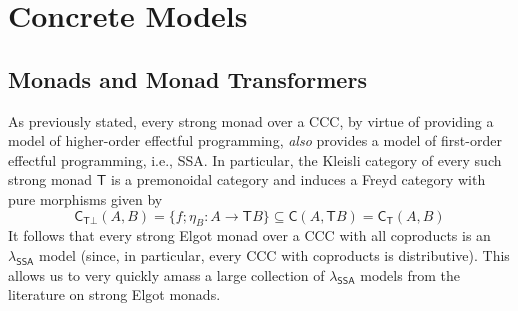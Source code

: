 \documentclass[acmsmall,screen,review]{acmart}
\newcommand{\ms}[1]{\ensuremath{\mathsf{#1}}}
\newcommand{\isotopessa}{\(\lambda_{\ms{SSA}}\)}
\begin{document}
\section{Concrete Models}

\label{sec:concrete}

\subsection{Monads and Monad Transformers}

As previously stated, every strong monad over a CCC, by virtue of providing a
model of higher-order effectful programming, \emph{also} provides a model of
first-order effectful programming, i.e., SSA. In particular, the Kleisli
category of every such strong monad $\ms{T}$ is a premonoidal category and
induces a Freyd category with pure morphisms given by
\begin{equation}
  \ms{C}_{\ms{T}\bot}(A, B) = \{f;\eta_B : A \to \ms{T}B\} 
  \subseteq \ms{C}(A, \ms{T}B) = \ms{C}_{\ms{T}}(A, B)
\end{equation}
It follows that every strong Elgot monad over a CCC with all coproducts is an
\isotopessa{} model (since, in particular, every CCC with coproducts is
distributive). This allows us to very quickly amass a large collection of
\isotopessa{} models from the literature on strong Elgot monads.
\end{document}
